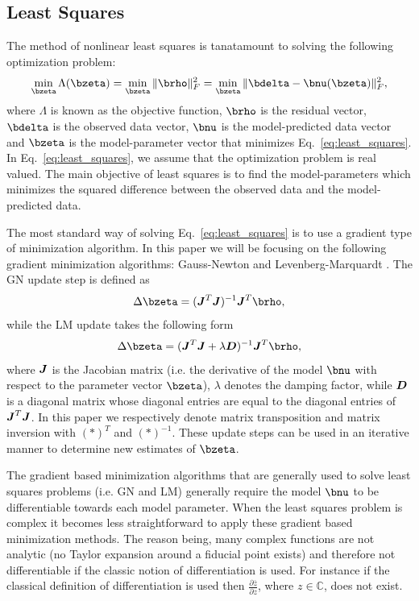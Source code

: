 \documentclass[useAMS,usenatbib]{mn2e}
\newcommand{\bJ}{\bmath{J}}
\newcommand{\bD}{\bmath{D}}
\newcommand{\conj}[1]{\overline{#1}}
\begin{document}
\subsection{Least Squares}
\label{sec:ls}
The method of nonlinear least squares is tanatamount to solving the following optimization problem:  
\begin{equation}
\label{eq:least_squares}
\min_{\bzeta} \Lambda(\bzeta) = \min_{\bzeta} \|\brho\|_F^2 = \min_{\bzeta} \|\bdelta - \bnu(\bzeta)\|_F^2, 
\end{equation}
where $\Lambda$ is known as the objective function, $\brho$ is the residual vector, $\bdelta$ is the observed data vector, $\bnu$ is the model-predicted data vector and $\bzeta$ is the model-parameter vector that minimizes Eq.~\eqref{eq:least_squares}.
In Eq.~\eqref{eq:least_squares}, we assume that the optimization problem is real valued.
The main objective of least squares is to find the model-parameters which minimizes the squared difference between the observed data and the model-predicted data.

The most standard way of solving Eq.~\eqref{eq:least_squares} is to use a gradient type of minimization algorithm. In this paper we will be focusing on the following gradient minimization algorithms: Gauss-Newton and Levenberg-Marquardt \citep{Levenberg1944,Marquardt1963}. 
The GN update step is defined as
\begin{equation}
 \Delta \bzeta = (\bJ^T\bJ)^{-1} \bJ^T\brho,
\end{equation}
while the LM update takes the following form
\begin{equation}
 \Delta \bzeta = (\bJ^T\bJ+\lambda\bD)^{-1} \bJ^T\brho,
\end{equation}
where $\bJ$ is the Jacobian matrix (i.e. the derivative of the model $\bnu$ with respect to the parameter vector $\bzeta$), $\lambda$ denotes the 
damping factor, while $\bD$ is a diagonal matrix whose diagonal entries are equal to the diagonal entries of $\bJ^T\bJ$. In this paper we respectively denote 
matrix transposition and matrix inversion with $(*)^T$ and $(*)^{-1}$.
These update steps can be used in an iterative manner to determine new estimates of $\bzeta$.

The gradient based minimization algorithms that are generally used to solve least squares problems (i.e. GN and LM) generally require the model $\bnu$ to be differentiable
towards each model parameter. When the least squares problem is complex it becomes less straightforward to apply these gradient based minimization methods. The reason being,
many complex functions are not analytic (no Taylor expansion around a fiducial point exists) and therefore not differentiable if the classic notion of differentiation is used. For instance if the 
classical definition of differentiation is used then $\frac{\partial \conj{z}}{\partial z}$, where $z \in \mathbb{C}$, does not exist.
\end{document}
